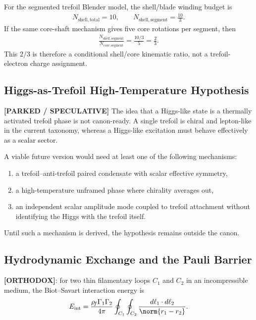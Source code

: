 For the segmented trefoil Blender model, the shell/blade winding budget is
\begin{align}
    N_{\mathrm{shell,total}}=10,
    \qquad
    N_{\mathrm{shell,segment}}=\frac{10}{3}.
\end{align}
If the same core-shaft mechanism gives five core rotations per segment, then
\begin{align}
    \frac{N_{\mathrm{shell,segment}}}{N_{\mathrm{core,segment}}}
    =
    \frac{10/3}{5}
    =
    \frac{2}{3}.
\end{align}
This $2/3$ is therefore a conditional shell/core kinematic ratio, not a trefoil-electron charge assignment.

\subsection{Higgs-as-Trefoil High-Temperature Hypothesis}
\label{subsec:rt_higgs_trefoil_parked}

\textbf{[PARKED / SPECULATIVE]} The idea that a Higgs-like state is a thermally activated trefoil phase is not canon-ready. A single trefoil is chiral and lepton-like in the current taxonomy, whereas a Higgs-like excitation must behave effectively as a scalar sector.

A viable future version would need at least one of the following mechanisms:
\begin{enumerate}
    \item a trefoil--anti-trefoil paired condensate with scalar effective symmetry,
    \item a high-temperature unframed phase where chirality averages out,
    \item an independent scalar amplitude mode coupled to trefoil attachment without identifying the Higgs with the trefoil itself.
\end{enumerate}
Until such a mechanism is derived, the hypothesis remains outside the canon.



\subsection{Hydrodynamic Exchange and the Pauli Barrier}
\textbf{[ORTHODOX]}: for two thin filamentary loops $C_1$ and $C_2$ in an incompressible medium, the Biot--Savart interaction energy is
\begin{align}
    E_{\mathrm{int}}
    =
    \frac{\rhoF\Gamma_1\Gamma_2}{4\pi}
    \oint_{C_1}\oint_{C_2}
    \frac{d\ell_1\cdot d\ell_2}{\norm{r_1-r_2}}.
\end{align}

